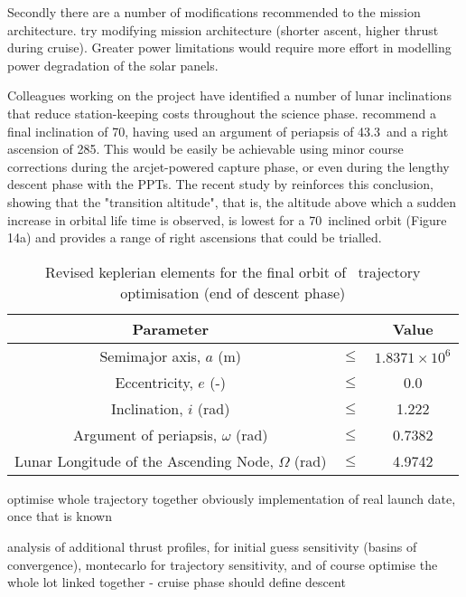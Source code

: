 Secondly there are a number of modifications recommended to the mission architecture. 
try modifying mission architecture (shorter ascent, higher thrust during cruise). Greater power limitations would require more effort in modelling power degradation of the solar panels.


Colleagues working on the project have identified a number of lunar inclinations that reduce station-keeping costs throughout the science phase. \textcite{Zeile2010} recommend a final inclination of 70\degrees, having used an argument of periapsis of 43.3\degrees\ and a right ascension of 285\degrees. This would be easily be achievable using minor course corrections during the arcjet-powered capture phase, or even during the lengthy descent phase with the PPTs. The recent study by \textcite{Gupta2011} reinforces this conclusion, showing that the "transition altitude", that is, the altitude above which a sudden increase in orbital life time is observed, is lowest for a 70\degrees\ inclined orbit (Figure 14a) and provides a range of right ascensions that could be trialled.

\begin{table}[h]
\caption{Revised keplerian elements for the final orbit of \BW\ trajectory optimisation (end of descent phase)}
\label{tab:Phase-5-constraints-revised}
\begin{center}
\begin{tabular} {ccc}\toprule
Parameter && Value\\\midrule
Semimajor axis, $a$ (m) &$\le$& $1.8371\times 10^6$\\
Eccentricity, $e$ (-) &$\le$& 0.0\\
Inclination, $i$ (rad) &$\le$& 1.222\\
Argument of periapsis, $\omega$ (rad) &$\le$& 0.7382 \\
Lunar Longitude of the Ascending Node, $\Omega$ (rad) &$\le$& 4.9742 \\\bottomrule
\end{tabular}
\end{center}
\end{table}


optimise whole trajectory together
obviously implementation of real launch date, once that is known

analysis of additional thrust profiles, for initial guess sensitivity (basins of convergence), montecarlo for trajectory sensitivity, and of course optimise the whole lot linked together - cruise phase should define descent

